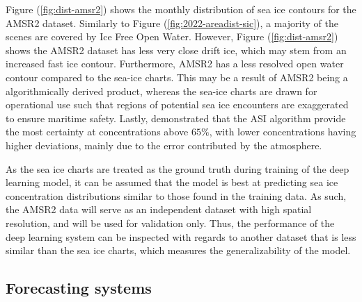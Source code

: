 \documentclass[../main/thesis.tex]{subfiles}
\begin{document}
Figure (\ref{fig:dist-amsr2}) shows the monthly distribution of sea ice contours for the AMSR2 dataset. Similarly to Figure (\ref{fig:2022-areadist-sic}), a majority of the scenes are covered by Ice Free Open Water. However, Figure (\ref{fig:dist-amsr2}) shows the AMSR2 dataset has less very close drift ice, which may stem from an increased fast ice contour. Furthermore, AMSR2 has a less resolved open water contour compared to the sea-ice charts. This may be a result of AMSR2 being a algorithmically derived product, whereas the sea-ice charts are drawn for operational use such that regions of potential sea ice encounters are exaggerated to ensure maritime safety. Lastly, \citet{Spreen2008} demonstrated that the ASI algorithm provide the most certainty at concentrations above $65\%$, with lower concentrations having higher deviations, mainly due to the error contributed by the atmosphere. 

As the sea ice charts are treated as the ground truth during training of the deep learning model, it can be assumed that the model is best at predicting sea ice concentration distributions similar to those found in the training data. As such, the AMSR2 data will serve as an independent dataset with high spatial resolution, and will be used for validation only. Thus, the performance of the deep learning system can be inspected with regards to another dataset that is less similar than the sea ice charts, which measures the generalizability of the model.

\subsection{Forecasting systems} 
\end{document}
